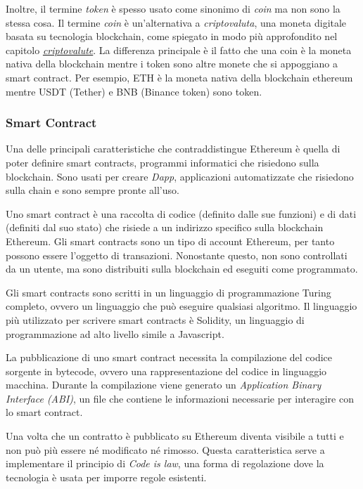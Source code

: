 Inoltre, il termine \textit{token} è spesso usato come sinonimo di \textit{coin} ma non sono la stessa cosa.
Il termine \textit{coin} è un'alternativa a \textit{criptovaluta}, una moneta digitale basata su tecnologia blockchain, come spiegato in modo più approfondito nel capitolo \hyperref[sec:criptovalute]{\textit{criptovalute}}.
La differenza principale è il fatto che una coin è la moneta nativa della blockchain mentre i token sono altre monete che si appoggiano a smart contract.
Per esempio, ETH è la moneta nativa della blockchain ethereum mentre USDT (Tether) e BNB (Binance token) sono token.\cite{coinbase-token} 

\subsubsection{Smart Contract}
\label{sec:smart-contract}
Una delle principali caratteristiche che contraddistingue Ethereum è quella di poter definire smart contracts, programmi informatici che risiedono sulla blockchain.
Sono usati per creare \textit{Dapp}, applicazioni automatizzate che risiedono sulla chain e sono sempre pronte all'uso.

Uno smart contract è una raccolta di codice (definito dalle sue funzioni) e di dati (definiti dal suo stato) che risiede a un indirizzo specifico sulla blockchain Ethereum. 
Gli smart contracts sono un tipo di account Ethereum, per tanto possono essere l'oggetto di transazioni.
Nonostante questo, non sono controllati da un utente, ma sono distribuiti sulla blockchain ed eseguiti come programmato. \cite{smart-contracts}

Gli smart contracts sono scritti in un linguaggio di programmazione Turing completo, ovvero un linguaggio che può eseguire qualsiasi algoritmo. 
Il linguaggio più utilizzato per scrivere smart contracts è Solidity, un linguaggio di programmazione ad alto livello simile a Javascript. \cite{solidity}

La pubblicazione di uno smart contract necessita la compilazione del codice sorgente in bytecode, ovvero una rappresentazione del codice in linguaggio macchina. Durante la compilazione viene generato un \textit{Application Binary Interface (ABI)}, un file che contiene le informazioni necessarie per interagire con lo smart contract. \cite{smart-contracts}

Una volta che un contratto è pubblicato su Ethereum diventa visibile a tutti e non può più essere né modificato né rimosso.
Questa caratteristica serve a implementare il principio di \textit{Code is law}, una forma di regolazione dove la tecnologia è usata per imporre regole esistenti. \cite{code-is-law}

